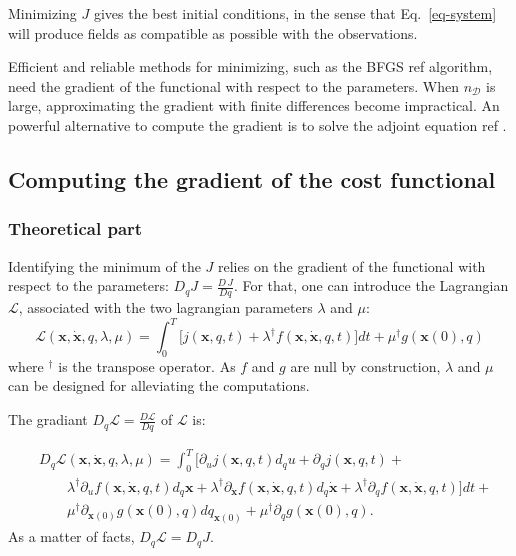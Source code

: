 \documentclass[aip,pof,nofootinbib,reprint,onecolumn]{revtex4-1}
\newcommand{\todo}[1]{{\color{red} #1 }}
\newcommand{\gras}[1]{\boldsymbol{#1}}
\newcommand{\mypar}[1]{\left(#1\right)}
\newcommand{\Nphaz}{n_{\mathcal{D}}} %
\newcommand{\fdyn}{f} %
\newcommand{\costf}{J} %
\newcommand{\costff}{j} %
\newcommand{\lag}{\mathcal{L}} %
\newcommand{\point}{\gras{x}} %
\begin{document}
Minimizing $\costf$ gives the best initial conditions, in the sense that Eq.~\eqref{eq-system} will produce fields as compatible as possible with the observations.

Efficient and reliable methods for minimizing, such as the BFGS\todo{ref} algorithm, need the gradient of the functional with respect to the parameters. When $\Nphaz$ is large, approximating the gradient with finite differences become impractical. An powerful alternative to compute the gradient is to solve the adjoint equation\todo{ref}.
\subsection{Computing the gradient of the cost functional}

\subsubsection{Theoretical part}

Identifying the minimum of the $\costf$ relies on the gradient of the functional with respect to the parameters: $D_q\costf = \frac{D\,\costf}{Dq}$.
For that, one can introduce the Lagrangian $\lag$, associated with the two lagrangian parameters $\lambda$ and $\mu$:
\begin{equation} \lag\mypar{\point,\dot{\point},q,\lambda,\mu} = \int_0^T  \bigg[\costff(\point,q,t) + \lambda^{\dagger}\fdyn(\point,\dot{\point},q,t) \bigg] dt + \mu^{\dagger} g(\point(0),q) 
\label{eq-lag}
\end{equation}
where $^{\dagger}$ is the transpose operator. 
As $\fdyn$ and $g$ are null by construction, $\lambda$ and $\mu$ can be designed for alleviating the computations.

The gradiant $D_q\lag = \frac{D\lag}{Dq}$ of $\lag$ is:

\begin{equation}
\begin{split}
&D_q\lag\mypar{\point,\dot{\point},q,\lambda,\mu} = \int_0^T  \bigg[\partial_u\costff(\point,q,t)d_qu  +\partial_{q} \costff(\point,q,t) + \\
& \qquad \lambda^{\dagger} \partial_u  \fdyn(\point,\dot{\point},q,t) d_q \point + \lambda^{\dagger}\partial_{\dot{\point}} \fdyn(\point,\dot{\point},q,t)d_q \dot{\point}  + \lambda^{\dagger}\partial_q\fdyn(\point,\dot{\point},q,t) \bigg]dt + \\
& \qquad \mu^{\dagger} \partial_{\point(0)} g(\point(0),q) dq_{\point(0)}  + \mu^{\dagger} \partial_q g(\point(0),q) .
\end{split}
\label{eq-deriv_lag}
\end{equation}
As a matter of facts, $D_q\lag = D_q \costf$.
\end{document}

